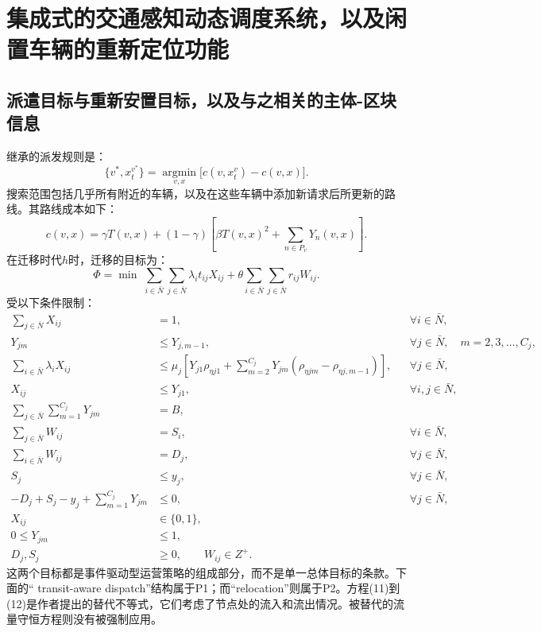 \documentclass{article}
\begin{document}
\section*{集成式的交通感知动态调度系统，以及闲置车辆的重新定位功能}

\subsection*{派遣目标与重新安置目标，以及与之相关的主体-区块信息}
继承的派发规则是：
\begin{equation}
\{v^*,x_t^{v^*}\}=\operatorname*{argmin}_{v,x}
\bigl[c(v,x_t^v)-c(v,x)\bigr].\tag{1}
\end{equation}
搜索范围包括几乎所有附近的车辆，以及在这些车辆中添加新请求后所更新的路线。其路线成本如下：
\begin{equation}
c(v,x)=\gamma T(v,x)+(1-\gamma)
\left[\beta T(v,x)^2+\sum_{n\in P_v}Y_n(v,x)\right].\tag{2}
\end{equation}
在迁移时代$h$时，迁移的目标为：
\begin{equation}
\Phi=\min\;\sum_{i\in\bar N}\sum_{j\in\bar N}\lambda_i t_{ij}X_{ij}
+\theta\sum_{i\in\bar N}\sum_{j\in\bar N}r_{ij}W_{ij}.\tag{3}
\end{equation}
受以下条件限制：
\begin{align}
\sum_{j\in\bar N}X_{ij}&=1,
&&\forall i\in\bar N,\tag{4}\\
Y_{jm}&\leq Y_{j,m-1},
&&\forall j\in\bar N,\quad m=2,3,\ldots,C_j,\tag{5}\\
\sum_{i\in\bar N}\lambda_iX_{ij}
&\leq\mu_j\left[Y_{j1}\rho_{\eta j1}
+\sum_{m=2}^{C_j}Y_{jm}(\rho_{\eta jm}-\rho_{\eta j,m-1})\right],
&&\forall j\in\bar N,\tag{6}\\
X_{ij}&\leq Y_{j1},&&\forall i,j\in\bar N,\tag{7}\\
\sum_{j\in\bar N}\sum_{m=1}^{C_j}Y_{jm}&=B,\tag{8}\\
\sum_{j\in\bar N}W_{ij}&=S_i,&&\forall i\in\bar N,\tag{9}\\
\sum_{i\in\bar N}W_{ij}&=D_j,&&\forall j\in\bar N,\tag{10}\\
S_j&\leq y_j,&&\forall j\in\bar N,\tag{11}\\
-D_j+S_j-y_j+\sum_{m=1}^{C_j}Y_{jm}&\leq0,
&&\forall j\in\bar N,\tag{12}\\
X_{ij}&\in\{0,1\},\tag{13}\\
0\leq Y_{jm}&\leq1,\tag{14}\\
D_j,S_j&\geq0,\qquad W_{ij}\in Z^+.\tag{15}
\end{align}
这两个目标都是事件驱动型运营策略的组成部分，而不是单一总体目标的条款。下面的“ transit-aware dispatch”结构属于P1；而“relocation”则属于P2。方程(11)到(12)是作者提出的替代不等式，它们考虑了节点处的流入和流出情况。被替代的流量守恒方程则没有被强制应用。
\end{document}
